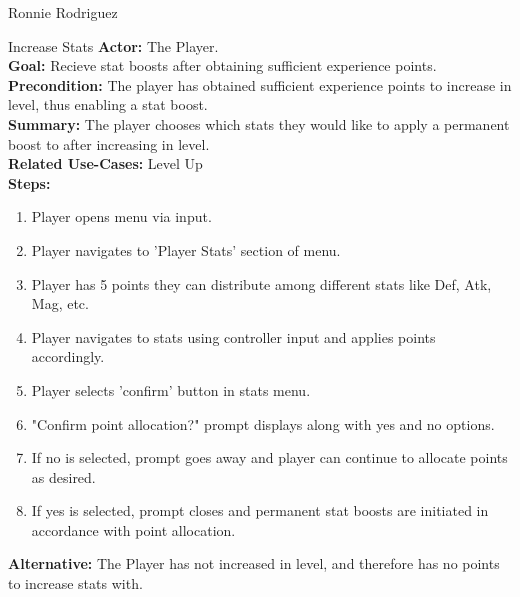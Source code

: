 \documentclass[12pt]{report}
\begin{document}
\begin{section}{Ronnie Rodriguez}
\begin{subsection}{Increase Stats}
\textbf{Actor:} The Player. \\
\textbf{Goal:} Recieve stat boosts after obtaining sufficient experience points. \\
\textbf{Precondition:} The player has obtained sufficient experience points to increase in level, thus enabling a stat boost. \\
\textbf{Summary:} The player chooses which stats they would like to apply a permanent boost to after increasing in level.  \\
\textbf{Related Use-Cases:} Level Up \\
\textbf{Steps:}
\begin{enumerate}
	\item Player opens menu via input.
	\item Player navigates to 'Player Stats' section of menu.
	\item Player has 5 points they can distribute among different stats like Def, Atk, Mag, etc.
	\item Player navigates to stats using controller input and applies points accordingly.
	\item Player selects 'confirm' button in stats menu.
	\item "Confirm point allocation?" prompt displays along with yes and no options.
	\item If no is selected, prompt goes away and player can continue to allocate points as desired.
	\item If yes is selected, prompt closes and permanent stat boosts are initiated in accordance with point allocation.
\end{enumerate}
\textbf{Alternative:} The Player has not increased in level, and therefore has no points to increase stats with.
\end{subsection}


\end{section}
\end{document}

